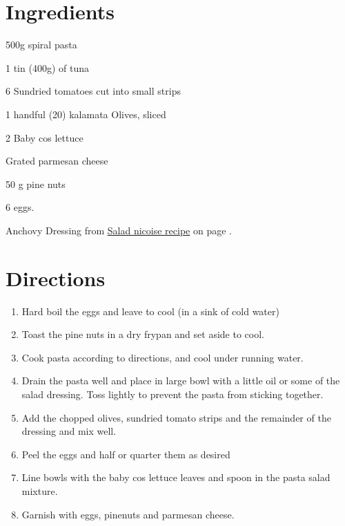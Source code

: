 

\section*{Ingredients}
\begin{ingredients-list}
	\item 500g spiral pasta
	\item 1 tin (400g) of tuna
	\item 6 Sundried tomatoes cut into small strips
	\item 1 handful (20) kalamata Olives, sliced
	\item 2 Baby cos lettuce
	\item Grated parmesan cheese
	\item 50 g pine nuts
	\item 6 eggs.
	\item Anchovy Dressing from \hyperlink{salad_nicoise}{Salad nicoise recipe} on page \pageref{salad_nicoise}.
\end{ingredients-list}

\section*{Directions}
\begin{enumerate}
	\item Hard boil the eggs and leave to cool (in a sink of cold water)
	\item Toast the pine nuts in a dry frypan and set aside to cool.
	\item Cook pasta according to directions, and cool under running water.
	\item Drain the pasta well and place in large bowl with a little oil or some of the salad dressing.
		Toss lightly to prevent the pasta from sticking together.
	\item Add the chopped olives, sundried tomato strips and the remainder of the dressing and mix well.
	\item Peel the eggs and half or quarter them as desired
	\item Line bowls with the baby cos lettuce leaves and spoon in the pasta salad mixture.
	\item Garnish with eggs, pinenuts and parmesan cheese.
\end{enumerate}


